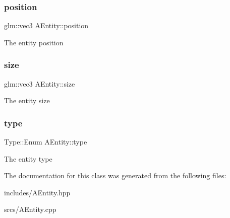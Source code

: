 \subsubsection{\texorpdfstring{position}{position}}
{\footnotesize\ttfamily glm\+::vec3 A\+Entity\+::position}

The entity position \mbox{\label{class_a_entity_a47f976f25e6214669d64fb2bbb2c455a}} 
\subsubsection{\texorpdfstring{size}{size}}
{\footnotesize\ttfamily glm\+::vec3 A\+Entity\+::size\hspace{0.3cm}{\ttfamily [protected]}}

The entity size \mbox{\label{class_a_entity_a4cddb4c9fbae86691e73940edc3731c3}} 
\subsubsection{\texorpdfstring{type}{type}}
{\footnotesize\ttfamily Type\+::\+Enum A\+Entity\+::type}

The entity type 

The documentation for this class was generated from the following files\+:\begin{DoxyCompactItemize}
\item 
includes/A\+Entity.\+hpp\item 
srcs/A\+Entity.\+cpp\end{DoxyCompactItemize}
